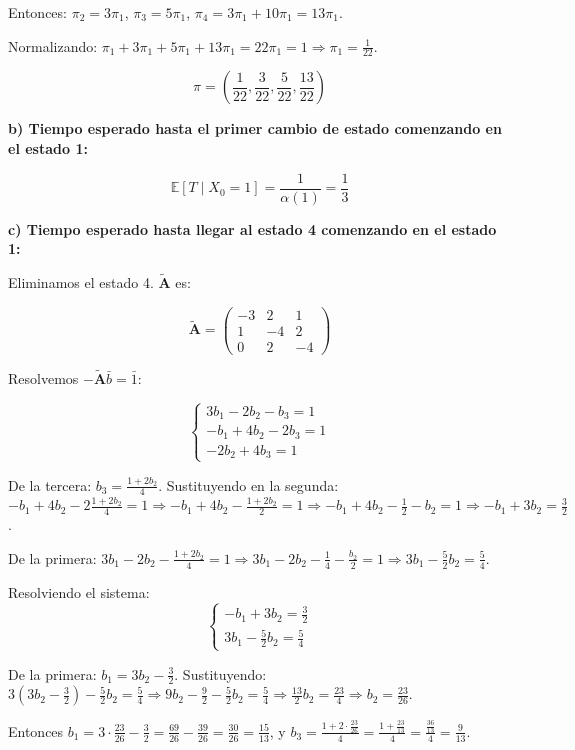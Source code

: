 \documentclass{article}
\theoremstyle{definition}
\newcommand{\E}{\mathbb{E}}
\newcommand{\A}{\mathbf{A}}
\begin{document}
Entonces: $\pi_2 = 3\pi_1$, $\pi_3 = 5\pi_1$, $\pi_4 = 3\pi_1 + 10\pi_1 = 13\pi_1$.

Normalizando: $\pi_1 + 3\pi_1 + 5\pi_1 + 13\pi_1 = 22\pi_1 = 1 \Rightarrow \pi_1 = \frac{1}{22}$.

\[
\pi = \left(\frac{1}{22}, \frac{3}{22}, \frac{5}{22}, \frac{13}{22}\right)
\]

\textbf{b) Tiempo esperado hasta el primer cambio de estado comenzando en el estado 1:}

\[
\E[T \mid X_0 = 1] = \frac{1}{\alpha(1)} = \frac{1}{3}
\]

\textbf{c) Tiempo esperado hasta llegar al estado 4 comenzando en el estado 1:}

Eliminamos el estado 4. $\tilde{\A}$ es:

\[
\tilde{\A} = \begin{pmatrix}
    -3 & 2 & 1 \\
    1 & -4 & 2 \\
    0 & 2 & -4
\end{pmatrix}
\]

Resolvemos $-\tilde{\A}\bar{b} = \bar{1}$:

\[
\begin{cases}
    3b_1 - 2b_2 - b_3 = 1 \\
    -b_1 + 4b_2 - 2b_3 = 1 \\
    -2b_2 + 4b_3 = 1
\end{cases}
\]

De la tercera: $b_3 = \frac{1+2b_2}{4}$.  
Sustituyendo en la segunda: $-b_1 + 4b_2 - 2\frac{1+2b_2}{4} = 1 \Rightarrow -b_1 + 4b_2 - \frac{1+2b_2}{2} = 1 \Rightarrow -b_1 + 4b_2 - \frac{1}{2} - b_2 = 1 \Rightarrow -b_1 + 3b_2 = \frac{3}{2}$.

De la primera: $3b_1 - 2b_2 - \frac{1+2b_2}{4} = 1 \Rightarrow 3b_1 - 2b_2 - \frac{1}{4} - \frac{b_2}{2} = 1 \Rightarrow 3b_1 - \frac{5}{2}b_2 = \frac{5}{4}$.

Resolviendo el sistema:
\[
\begin{cases}
    -b_1 + 3b_2 = \frac{3}{2} \\
    3b_1 - \frac{5}{2}b_2 = \frac{5}{4}
\end{cases}
\]

De la primera: $b_1 = 3b_2 - \frac{3}{2}$.  
Sustituyendo: $3(3b_2 - \frac{3}{2}) - \frac{5}{2}b_2 = \frac{5}{4} \Rightarrow 9b_2 - \frac{9}{2} - \frac{5}{2}b_2 = \frac{5}{4} \Rightarrow \frac{13}{2}b_2 = \frac{23}{4} \Rightarrow b_2 = \frac{23}{26}$.

Entonces $b_1 = 3\cdot\frac{23}{26} - \frac{3}{2} = \frac{69}{26} - \frac{39}{26} = \frac{30}{26} = \frac{15}{13}$, y $b_3 = \frac{1+2\cdot\frac{23}{26}}{4} = \frac{1+\frac{23}{13}}{4} = \frac{\frac{36}{13}}{4} = \frac{9}{13}$.
\end{document}
